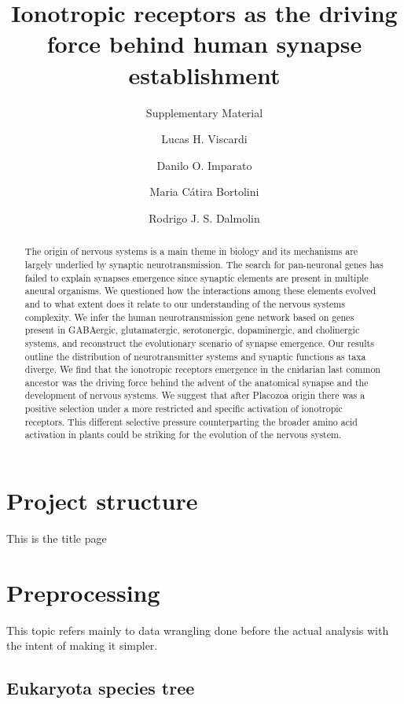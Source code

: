 \documentclass[
]{article}
\title{Ionotropic receptors as the driving force behind human synapse
establishment}
\subtitle{Supplementary Material}
\author{Lucas H. Viscardi \and Danilo O. Imparato \and Maria Cátira Bortolini \and Rodrigo J. S. Dalmolin}
\date{}
\begin{document}
\maketitle
\begin{abstract}
The origin of nervous systems is a main theme in biology and its
mechanisms are largely underlied by synaptic neurotransmission. The
search for pan-neuronal genes has failed to explain synapses emergence
since synaptic elements are present in multiple aneural organisms. We
questioned how the interactions among these elements evolved and to what
extent does it relate to our understanding of the nervous systems
complexity. We infer the human neurotransmission gene network based on
genes present in GABAergic, glutamatergic, serotonergic, dopaminergic,
and cholinergic systems, and reconstruct the evolutionary scenario of
synapse emergence. Our results outline the distribution of
neurotransmitter systems and synaptic functions as taxa diverge. We find
that the ionotropic receptors emergence in the cnidarian last common
ancestor was the driving force behind the advent of the anatomical
synapse and the development of nervous systems. We suggest that after
Placozoa origin there was a positive selection under a more restricted
and specific activation of ionotropic receptors. This different
selective pressure counterparting the broader amino acid activation in
plants could be striking for the evolution of the nervous system.
\end{abstract}

{
\setcounter{tocdepth}{3}
\tableofcontents
}
\hypertarget{project-structure}{%
\section{Project structure}\label{project-structure}}

This is the title page

\hypertarget{preprocessing}{%
\section{Preprocessing}\label{preprocessing}}

This topic refers mainly to data wrangling done before the actual
analysis with the intent of making it simpler.

\hypertarget{eukaryota-species-tree}{%
\subsection{Eukaryota species tree}\label{eukaryota-species-tree}}
\end{document}
